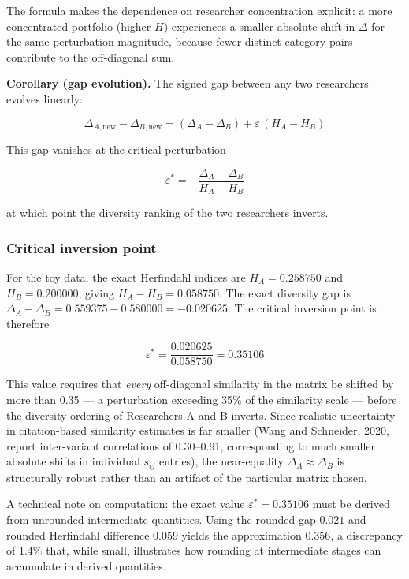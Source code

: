 \documentclass[
]{article}
\begin{document}
The formula makes the dependence on researcher concentration explicit: a
more concentrated portfolio (higher \(H\)) experiences a smaller
absolute shift in \(\Delta\) for the same perturbation magnitude,
because fewer distinct category pairs contribute to the off-diagonal
sum.

\textbf{Corollary (gap evolution).} The signed gap between any two
researchers evolves linearly:

\[\Delta_{A,\text{new}} - \Delta_{B,\text{new}} = (\Delta_A - \Delta_B)
  + \varepsilon\,(H_A - H_B)\]

This gap vanishes at the critical perturbation

\[\varepsilon^* = -\frac{\Delta_A - \Delta_B}{H_A - H_B}\]

at which point the diversity ranking of the two researchers inverts.

\hypertarget{critical-inversion-point}{%
\subsubsection{Critical inversion
point}\label{critical-inversion-point}}

For the toy data, the exact Herfindahl indices are \(H_A = 0.258750\)
and \(H_B = 0.200000\), giving \(H_A - H_B = 0.058750\). The exact
diversity gap is
\(\Delta_A - \Delta_B = 0.559375 - 0.580000 = -0.020625\). The critical
inversion point is therefore

\[\varepsilon^* = \frac{0.020625}{0.058750} = 0.35106\]

This value requires that \emph{every} off-diagonal similarity in the
matrix be shifted by more than 0.35 --- a perturbation exceeding 35\% of
the similarity scale --- before the diversity ordering of Researchers A
and B inverts. Since realistic uncertainty in citation-based similarity
estimates is far smaller (Wang and Schneider, 2020, report inter-variant
correlations of 0.30--0.91, corresponding to much smaller absolute
shifts in individual \(s_{ij}\) entries), the near-equality
\(\Delta_A \approx \Delta_B\) is structurally robust rather than an
artifact of the particular matrix chosen.

A technical note on computation: the exact value
\(\varepsilon^* = 0.35106\) must be derived from unrounded intermediate
quantities. Using the rounded gap \(0.021\) and rounded Herfindahl
difference \(0.059\) yields the approximation \(0.356\), a discrepancy
of 1.4\% that, while small, illustrates how rounding at intermediate
stages can accumulate in derived quantities.
\end{document}
